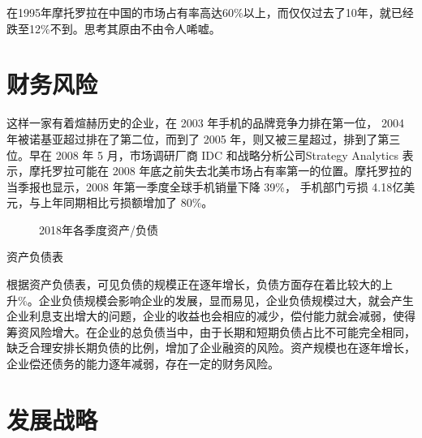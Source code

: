 \documentclass{ctexart}
\begin{document}
在1995年摩托罗拉在中国的市场占有率高达60\%以上，而仅仅过去了10年，就已经跌至12\%不到。思考其原由不由令人唏嘘。\cite{吴定祥2015中国联想并购摩托罗拉案例分析}

\section{财务风险}%
\label{sec:财务风险}

这样一家有着煊赫历史的企业，在 2003 年手机的品牌竞争力排在第一位， 2004 年被诺基亚超过排在了第二位，而到了 2005 年，则又被三星超过，排到了第三位。早在 2008 年 5 月，市场调研厂商 IDC 和战略分析公司Strategy Analytics 表示，摩托罗拉可能在 2008 年底之前失去北美市场占有率第一的位置。摩托罗拉的当季报也显示，2008 年第一季度全球手机销量下降 39\%， 手机部门亏损 4.18亿美元，与上年同期相比亏损额增加了 80\%。

\begin{figure}[htpb]
	\centering
	\caption{2018年各季度资产/负债}
	\label{fig:2018年各季度资产/负债}
\end{figure}

\newpage

\begin{table}[htpb]
	\centering
	\caption{资产负债表}
	\label{tab:资产负债表}
\end{table}

根据资产负债表，可见负债的规模正在逐年增长，负债方面存在着比较大的上升\%。企业负债规模会影响企业的发展，显而易见，企业负债规模过大，就会产生企业利息支出增大的问题，企业的收益也会相应的减少，偿付能力就会减弱，使得筹资风险增大。在企业的总负债当中，由于长期和短期负债占比不可能完全相同，缺乏合理安排长期负债的比例，增加了企业融资的风险。资产规模也在逐年增长，企业偿还债务的能力逐年减弱，存在一定的财务风险。

\section{发展战略}%
\label{sec:发展战略}
\end{document}
